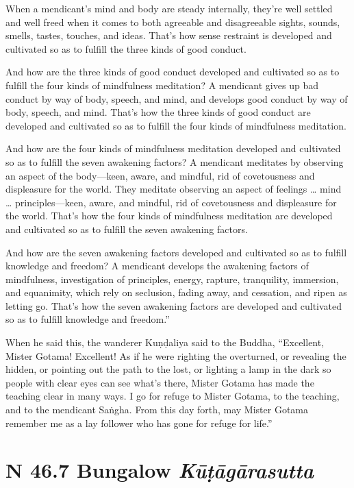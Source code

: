 \documentclass[12pt,openany]{book}%
\newcommand*{\suttatitleacronym}[1]{\smaller[2]{#1}\vspace*{.3em}}
\newcommand*{\suttatitletranslation}[1]{\linebreak{#1}}
\newcommand*{\suttatitleroot}[1]{\linebreak\smaller[2]\itshape{#1}}
\newcommand*{\tocacronym}[1]{\hspace*{-3.3em}{#1}\quad}
\newcommand*{\toctranslation}[1]{#1}
\newcommand*{\tocroot}[1]{(\textit{#1})}
\begin{document}
When a mendicant’s mind and body are steady internally, they’re well settled and well freed when it comes to both agreeable and disagreeable sights, sounds, smells, tastes, touches, and ideas. That’s how sense restraint is developed and cultivated so as to fulfill the three kinds of good conduct. 

And how are the three kinds of good conduct developed and cultivated so as to fulfill the four kinds of mindfulness meditation? A mendicant gives up bad conduct by way of body, speech, and mind, and develops good conduct by way of body, speech, and mind. That’s how the three kinds of good conduct are developed and cultivated so as to fulfill the four kinds of mindfulness meditation. 

And how are the four kinds of mindfulness meditation developed and cultivated so as to fulfill the seven awakening factors? A mendicant meditates by observing an aspect of the body—keen, aware, and mindful, rid of covetousness and displeasure for the world. They meditate observing an aspect of feelings … mind … principles—keen, aware, and mindful, rid of covetousness and displeasure for the world. That’s how the four kinds of mindfulness meditation are developed and cultivated so as to fulfill the seven awakening factors. 

And how are the seven awakening factors developed and cultivated so as to fulfill knowledge and freedom? A mendicant develops the awakening factors of mindfulness, investigation of principles, energy, rapture, tranquility, immersion, and equanimity, which rely on seclusion, fading away, and cessation, and ripen as letting go. That’s how the seven awakening factors are developed and cultivated so as to fulfill knowledge and freedom.” 

When he said this, the wanderer \textsanskrit{Kuṇḍaliya} said to the Buddha, “Excellent, Mister Gotama! Excellent! As if he were righting the overturned, or revealing the hidden, or pointing out the path to the lost, or lighting a lamp in the dark so people with clear eyes can see what’s there, Mister Gotama has made the teaching clear in many ways. I go for refuge to Mister Gotama, to the teaching, and to the mendicant \textsanskrit{Saṅgha}. From this day forth, may Mister Gotama remember me as a lay follower who has gone for refuge for life.” 

%
\section*{{\suttatitleacronym SN 46.7}{\suttatitletranslation A Bungalow }{\suttatitleroot Kūṭāgārasutta}}
\addcontentsline{toc}{section}{\tocacronym{SN 46.7} \toctranslation{A Bungalow } \tocroot{Kūṭāgārasutta}}
\end{document}
